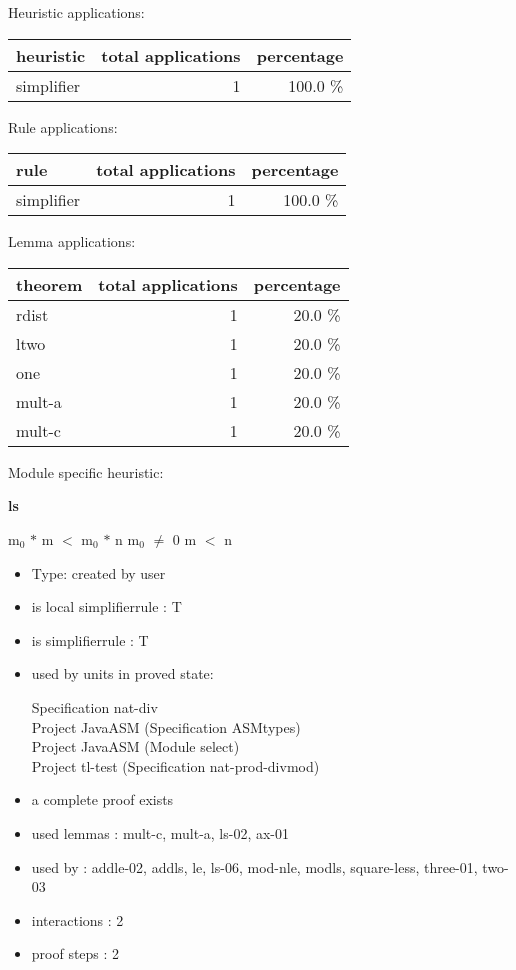 \documentclass[a4paper]{article}
\begin{document}
\medskip


Heuristic applications:

\begin{supertabular}{l|r|r}
heuristic	& total applications & percentage \\ \hline
simplifier & 1 & 100.0 \% \\

\end{supertabular}

Rule applications:

\begin{supertabular}{l|r|r}
rule	        & total applications & percentage \\ \hline
simplifier & 1 & 100.0 \% \\

\end{supertabular}

Lemma applications:

\begin{supertabular}{l|r|r}
theorem	        & total applications & percentage \\ \hline
rdist & 1 & 20.0 \% \\
ltwo & 1 & 20.0 \% \\
one & 1 & 20.0 \% \\
mult-a & 1 & 20.0 \% \\
mult-c & 1 & 20.0 \% \\

\end{supertabular}

Module specific heuristic:

\pagebreak

{\LARGE\bf ls}\label{lemma-ls}

\medskip

 \Fol $\mbox{m}_{0}$ $*$ m $<$ $\mbox{m}_{0}$ $*$ n \Equiv $\mbox{m}_{0}$ $\neq$ 0 \And m $<$ n

\begin{itemize}

\item Type: created by user

\item is local simplifierrule : T
\item is simplifierrule : T
\item used by units in proved state:

Specification nat-div \\
Project JavaASM (Specification ASMtypes) \\
Project JavaASM (Module select) \\
Project tl-test (Specification nat-prod-divmod)
\item       a complete proof exists
\item       used lemmas  : mult-c, mult-a, ls-02, ax-01
\item       used by      : addle-02, addls, le, ls-06, mod-nle, modls, square-less, three-01, two-03
\item       interactions : 2
\item       proof steps  : 2
\end{itemize}
\end{document}
